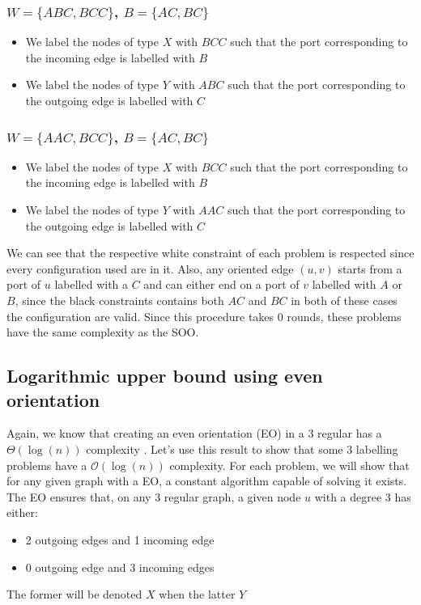 \subsubsection[(W = (ABC, BCC), B = (AC,BC)]{$W = \{ABC, BCC\}$, $B = \{AC, BC\}$}
\begin{itemize}
    \item We label the nodes of type $X$ with $BCC$ such that the port corresponding to the incoming edge is labelled with $B$
    \item We label the nodes of type $Y$ with $ABC$ such that the port corresponding to the outgoing edge is labelled with $C$
\end{itemize}

\subsubsection[(W = (AAC, BCC), B = (AC,BC)]{$W = \{AAC, BCC\}$, $B = \{AC, BC\}$}


\begin{itemize}
    \item We label the nodes of type $X$ with $BCC$ such that the port corresponding to the incoming edge is labelled with $B$
    \item We label the nodes of type $Y$ with $AAC$ such that the port corresponding to the outgoing edge is labelled with $C$
\end{itemize}

We can see that the respective white constraint of each problem is respected since every configuration used are in it. Also, any oriented edge $(u,v)$ starts from a port of $u$ labelled with a $C$ and can either end on a port of $v$ labelled with $A$ or $B$, since the black constraints contains both $AC$ and $BC$ in both of these cases the configuration are valid. Since this procedure takes 0 rounds, these problems have the same complexity as the SOO.



\subsection{Logarithmic upper bound using even orientation}
Again, we know that creating an even orientation (EO) in a 3 regular has a $\Theta(\log(n))$ complexity \cite{1}. Let's use this result to show that some 3 labelling problems have a $\mathcal{O}(\log(n))$ complexity. For each problem, we will show that for any given graph with a EO, a constant algorithm capable of solving it exists.\\
The EO ensures that, on any 3 regular graph, a given node $u$ with a degree 3 has either:
\begin{itemize}
    \item 2 outgoing edges and 1 incoming edge
    \item 0 outgoing edge and 3 incoming edges
\end{itemize}
The former will be denoted $X$ when the latter $Y$
